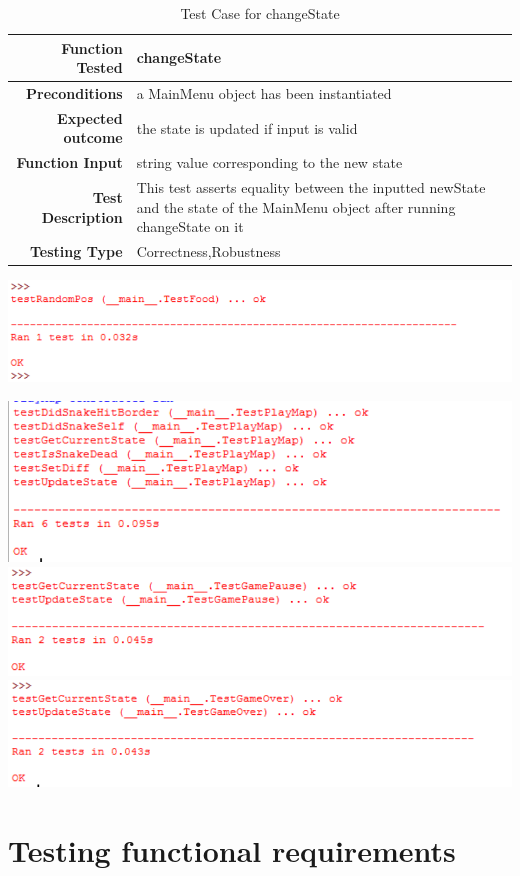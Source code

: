 \documentclass[12pt]{article}
\begin{document}
\begin{center}
	\begin{longtable}{ | r | p{4cm} | p{10cm} }
	\caption{Test Case for changeState} \\ \hline \label{TblInputVar} 
	\textbf{Function Tested} & changeState\\ \hline
	\textbf{Preconditions} & a MainMenu object has been instantiated \\ \hline
	\textbf{Expected outcome} & the state is updated if input is valid \\ \hline
	\textbf{Function Input} & string value corresponding to the new state \\ \hline
	\textbf{Test Description} & This test asserts equality between the inputted newState and the state of the MainMenu object after running changeState on it\\ \hline
	\textbf{Testing Type} & Correctness,Robustness\\ \hline
	
	\end{longtable}
\end{center}


\includegraphics{testFoodResults}\newline\newline

\includegraphics{testPlayMapResults}\newline\newline
\includegraphics{testGamePauseResults}\newline\newline
\includegraphics{testGameOverResults}\newline\newline

\section{Testing functional requirements}
\end{document}
